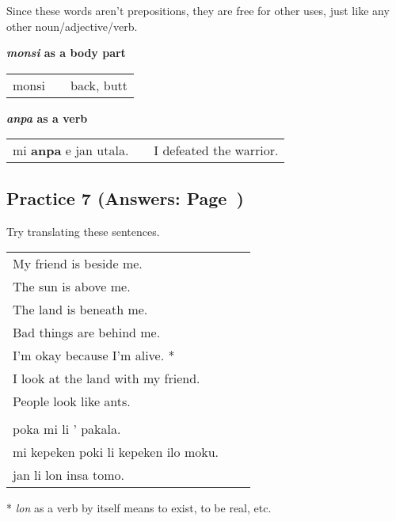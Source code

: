 Since these words aren't prepositions, they are free for other uses, just like any other noun/adjective/verb.

\textbf{\textit{monsi} as a body part} \\
\begin{supertabular}{p{5,5cm}|ll}
monsi && back, butt \\
\end{supertabular} 

\textbf{\textit{anpa} as a verb} \\
\begin{supertabular}{p{5,5cm}|ll}
mi \textbf{anpa} e jan utala. && I defeated the warrior. \\
\end{supertabular} 
%
\subsection*{Practice 7 (Answers: Page~\pageref{'other_prepositions'})}
%
Try translating these sentences.

\begin{supertabular}{p{5,5cm}|ll}
My friend is beside me. && \\ %
The sun is above me. && \\ %
The land is beneath me. && \\ %
Bad things are behind me. && \\ %
I'm okay because I'm alive. * && \\ %
I look at the land with my friend. && \\ %
People look like ants. && \\ %
 && \\ %
poka mi li ' pakala. && \\ %
mi kepeken poki li kepeken ilo moku. && \\ %
jan li lon insa tomo. && \\ %
\end{supertabular} 

* \textit{lon} as a verb by itself means to exist, to be real, etc. 
% 
